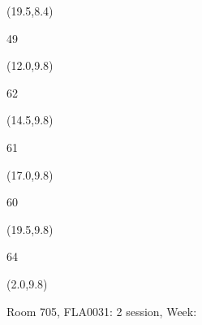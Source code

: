 \documentclass[a4paper]{article}
\newcommand{\myseat}[4]{%
\vspace{-0.1cm} \hspace{-0.5cm}
\parbox[t][2.2cm][t]{3.5cm}{%
\small #1 %
\begin{description}
\vspace{-0.1cm}
\item [ID:] #2
\vspace{-0.1cm}
\item [Team:] #3 \normalsize
\vspace{-0.1cm}
\item \normalsize #4
\vspace{-0.1cm}
\end{description}
}
}
\begin{document}
\begin{textblock}{2.5}(19.5,8.4)
\textblockcolor{}
\myseat{49}{}{}{}
\end{textblock}


\begin{textblock}{2.5}(12.0,9.8)
\textblockcolor{}
\myseat{62}{}{}{}
\end{textblock}

\begin{textblock}{2.5}(14.5,9.8)
\textblockcolor{}
\myseat{61}{}{}{}
\end{textblock}

\begin{textblock}{2.5}(17.0,9.8)
\textblockcolor{}
\myseat{60}{}{}{}
\end{textblock}

\begin{textblock}{2.5}(19.5,9.8)
\textblockcolor{}
\myseat{64}{}{}{}
\end{textblock}

\begin{textblock}{10}(2.0,9.8)
\textblockcolor{}
\parbox[t][2.2cm][t]{9.5cm}{%
\large Room 705, FLA0031: 2 session, Week: 
\vspace{-0.3cm} \hspace{-0.5cm}
}
\end{textblock}
\end{document}
